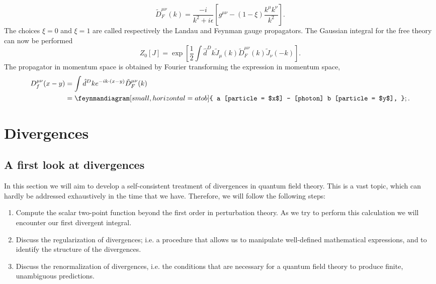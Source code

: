 \documentclass{article}
\numberwithin{equation}{section}
\begin{document}
\begin{equation}
    \tilde{D}_F^{\mu\nu}(k) = \frac{-i}{k^2+i\epsilon}\left[g^{\mu\nu} - (1-\xi)\frac{k^\mu k^\nu}{k^2}\right].
\end{equation}
The choices $\xi = 0$ and $\xi = 1$ are called respectively the Landau and Feynman gauge propagators. The Gaussian integral for the free theory can now be performed 
\begin{equation}
    Z_0[J] = \exp\left[\frac{1}{2}\int \hat{d}^Dk \tilde{J}_\mu(k) \tilde{D}_F^{\mu\nu}(k) \tilde{J}_\nu(-k)\right].
\end{equation}
The propagator in momentum space is obtained by Fourier transforming the expression in momentum space, 
\begin{equation}
\begin{aligned}
    D_f^{\mu\nu}(x-y) &= \int \hat{d}^Dk e^{-ik \cdot (x-y)} \tilde{D}_F^{\mu\nu}(k) \\
    &= \feynmandiagram[small, horizontal=a to b]{
        a [particle = $x$] -- [photon] b [particle = $y$],
    };.
\end{aligned}
\end{equation}

\section{Divergences}

\subsection{A first look at divergences}

In this section we will aim to develop a self-consistent treatment of divergences in quantum field theory. This is a vast topic, which can hardly be addressed exhaustively in the time that we have. Therefore, we will follow the following steps:
\begin{enumerate}
    \item Compute the scalar two-point function beyond the first order in perturbation theory. As we try to perform this calculation we will encounter our first divergent integral.
    \item Discuss the regularization of divergences; i.e. a procedure that allows us to manipulate well-defined mathematical expressions, and to identify the structure of the divergences.
    \item Discuss the renormalization of divergences, i.e. the conditions that are necessary for a quantum field theory to produce finite, unambiguous predictions.
\end{enumerate}
\end{document}
